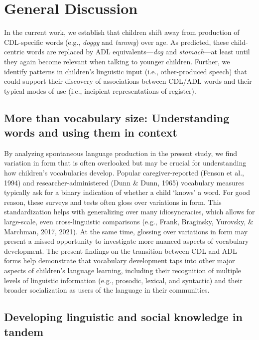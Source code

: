 \documentclass[10pt, letterpaper]{article}
\begin{document}
\hypertarget{general-discussion}{%
\section{General Discussion}\label{general-discussion}}

In the current work, we establish that children shift away from
production of CDL-specific words (e.g., \emph{doggy} and \emph{tummy})
over age. As predicted, these child-centric words are replaced by ADL
equivalents---\emph{dog} and \emph{stomach}---at least until they again
become relevant when talking to younger children. Further, we identify
patterns in children's linguistic input (i.e., other-produced speech)
that could support their discovery of associations between CDL/ADL words
and their typical modes of use (i.e., incipient representations of
register).

\hypertarget{more-than-vocabulary-size-understanding-words-and-using-them-in-context}{%
\subsection{More than vocabulary size: Understanding words and using
them in
context}\label{more-than-vocabulary-size-understanding-words-and-using-them-in-context}}

By analyzing spontaneous language production in the present study, we
find variation in form that is often overlooked but may be crucial for
understanding how children's vocabularies develop. Popular
caregiver-reported (Fenson et al., 1994) and researcher-administered
(Dunn \& Dunn, 1965) vocabulary measures typically ask for a binary
indication of whether a child `knows' a word. For good reason, these
surveys and tests often gloss over variations in form. This
standardization helps with generalizing over many idiosyncracies, which
allows for large-scale, even cross-linguistic comparisons (e.g., Frank,
Braginsky, Yurovsky, \& Marchman, 2017, 2021). At the same time,
glossing over variations in form may present a missed opportunity to
investigate more nuanced aspects of vocabulary development. The present
findings on the transition between CDL and ADL forms help demonstrate
that vocabulary development taps into other major aspects of children's
language learning, including their recognition of multiple levels of
linguistic information (e.g., prosodic, lexical, and syntactic) and
their broader socialization as users of the language in their
communities.

\hypertarget{developing-linguistic-and-social-knowledge-in-tandem}{%
\subsection{Developing linguistic and social knowledge in
tandem}\label{developing-linguistic-and-social-knowledge-in-tandem}}
\end{document}
